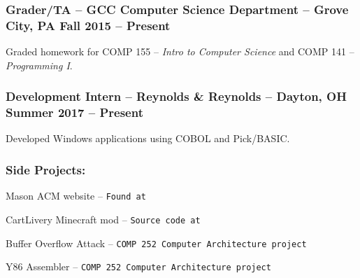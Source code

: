 \documentclass[12pt]{article}
\begin{document}
\subsubsection*{\textnormal{{\color{accent} Grader/TA }\color{head} -- GCC Computer Science Department -- Grove City, PA	\hfill Fall 2015 -- Present}}
\vspace{-2mm}
\begin{compactitem}
	\item Graded homework for COMP 155 -- \textit{Intro to Computer Science} and COMP 141 -- \textit{Programming I}.
\end{compactitem}
\vspace{-4.5mm}
\subsubsection*{\textnormal{{\color{accent} Development Intern }\color{head} -- Reynolds \& Reynolds -- Dayton, OH	\hfill Summer 2017 -- Present}}
\vspace{-2mm}
\begin{compactitem}
	\item Developed Windows applications using COBOL and Pick/BASIC.
\end{compactitem}

\subsubsection*{\color{head}Side Projects:}
\begin{compactitem}
	\item {\color{accent} Mason ACM website} -- \texttt{Found at \underline{}}
	\item {\color{accent} CartLivery Minecraft mod} -- \texttt{Source code at \underline{}}
	\item {\color{accent} Buffer Overflow Attack} -- \texttt{COMP 252 Computer Architecture project}
	\item {\color{accent} Y86 Assembler} -- \texttt{COMP 252 Computer Architecture project}
\end{compactitem}
\end{document}
